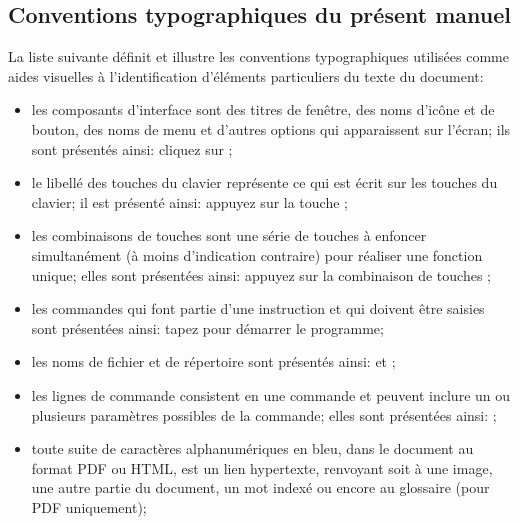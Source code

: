\subsection{Conventions typographiques du présent manuel\label{introduction-manual-conventions}}

La liste suivante définit et illustre les conventions typographiques utilisées comme aides visuelles à l'identification d'éléments particuliers du texte du document:

\begin{itemize}
	\item les composants d'interface sont des titres de fenêtre, des noms d'icône et de bouton, des noms de menu et d'autres options qui apparaissent sur l'écran; ils sont présentés ainsi:
		\newline
		\hspace*{1.5cm}cliquez sur ;
	\item le libellé des touches du clavier représente ce qui est écrit sur les touches du clavier; il est présenté ainsi:
		\newline
		\hspace*{1.5cm}appuyez sur la touche ;
	\item les combinaisons de touches sont une série de touches à enfoncer simultanément (à moins d'indication contraire) pour réaliser une fonction unique; elles sont présentées ainsi:
		\newline
		\hspace*{1.5cm}appuyez sur la combinaison de touches ;
	\item les commandes qui font partie d'une instruction et qui doivent être saisies sont présentées ainsi:
		\newline
		\hspace*{1.5cm}tapez  pour démarrer le programme;
	\item les noms de fichier et de répertoire sont présentés ainsi:
		\newline
		\hspace*{1.5cm} et ;	
	\item les lignes de commande consistent en une commande et peuvent inclure un ou plusieurs paramètres possibles de la commande; elles sont présentées ainsi:
		\newline
		\hspace*{1.5cm}	;
	\item toute suite de caractères alphanumériques en bleu, dans le document au format \gls{PDF} ou \gls{HTML}, est un lien hypertexte, renvoyant soit à une image, une autre partie du document, un mot indexé ou encore au glossaire (pour \gls{PDF} uniquement);

\end{itemize}
